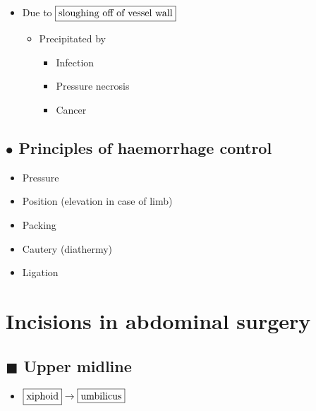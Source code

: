 \documentclass[
  12pt,
]{memoir}
\providecommand{\tightlist}{%
  \setlength{\itemsep}{0pt}\setlength{\parskip}{0pt}}
\begin{document}
\begin{itemize}
\tightlist
\item
  Due to \(\fbox{sloughing off of vessel wall}\)

  \begin{itemize}
  \tightlist
  \item
    Precipitated by

    \begin{itemize}
    \tightlist
    \item
      Infection
    \item
      Pressure necrosis
    \item
      Cancer
    \end{itemize}
  \end{itemize}
\end{itemize}

\hypertarget{bullet-principles-of-haemorrhage-control}{%
\subsection{\texorpdfstring{\(\bullet\) Principles of haemorrhage
control}{\textbackslash bullet Principles of haemorrhage control}}\label{bullet-principles-of-haemorrhage-control}}

\begin{itemize}
\tightlist
\item
  Pressure
\item
  Position (elevation in case of limb)
\item
  Packing
\item
  Cautery (diathermy)
\item
  Ligation
\end{itemize}

\hypertarget{incisions-in-abdominal-surgery}{%
\section{Incisions in abdominal
surgery}\label{incisions-in-abdominal-surgery}}

\hypertarget{blacksquare-upper-midline}{%
\subsection{\texorpdfstring{\(\blacksquare\) Upper
midline}{\textbackslash blacksquare Upper midline}}\label{blacksquare-upper-midline}}

\begin{itemize}
\tightlist
\item
  \(\fbox{xiphoid}\rightarrow\fbox{umbilicus}\)
\end{itemize}
\end{document}
